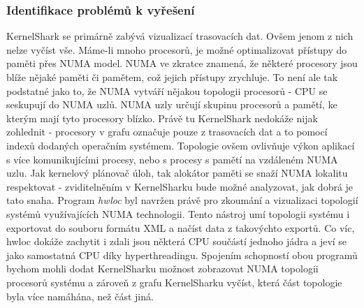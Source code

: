 \subsubsection*{Identifikace problémů k vyřešení}
KernelShark se primárně zabývá vizualizací trasovacích dat. Ovšem jenom z nich nelze vyčíst vše. Máme-li mnoho procesorů, je možné optimalizovat přístupy do paměti přes NUMA model. NUMA ve zkratce znamená, že některé procesory jsou blíže nějaké paměti či pamětem, což jejich přístupy zrychluje. To není ale tak podstatné jako to, že NUMA vytváří nějakou topologii procesorů - CPU se seskupují do NUMA uzlů. NUMA uzly určují skupinu procesorů a pamětí, ke kterým mají tyto procesory blízko. Právě tu KernelShark nedokáže nijak zohlednit - procesory v grafu označuje pouze z trasovacích dat a to pomocí indexů dodaných operačním systémem. Topologie ovšem ovlivňuje výkon aplikací s více komunikujícími procesy, nebo s procesy s pamětí na vzdáleném NUMA uzlu. Jak kernelový plánovač úloh, tak alokátor paměti se snaží NUMA lokalitu respektovat - zviditelněním  v KernelSharku bude možné analyzovat, jak dobrá je tato snaha. Program \emph{hwloc} byl navržen právě pro zkoumání a vizualizaci topologií systémů využívajících NUMA technologii. Tento nástroj umí topologii systému i exportovat do souboru formátu XML a načíst data z takovýchto exportů. Co víc, hwloc dokáže zachytit i zdali jsou některá CPU součástí jednoho jádra a jeví se jako samostatná CPU díky hyperthreadingu. Spojením schopností obou programů bychom mohli dodat KernelSharku možnost zobrazovat NUMA topologii procesorů systému a zároveň z grafu KernelSharku vyčíst, která část topologie byla více namáhána, než část jiná.  


